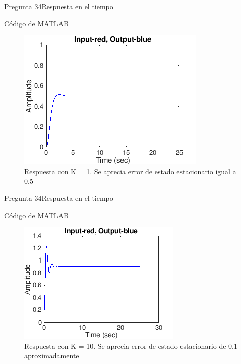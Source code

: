 \documentclass[10pt]{beamer}
\begin{document}
\begin{frame}{Pregunta 34}{Respuesta en el tiempo}
\begin{block}{Código de MATLAB}
\begin{figure}[h!]
\centering
\includegraphics [scale=0.6]{fig1}
\caption{Respuesta con K = 1. Se aprecia error de estado estacionario igual a 0.5}
\end{figure}
\end{block}
\end{frame}


\begin{frame}{Pregunta 34}{Respuesta en el tiempo}
\begin{block}{Código de MATLAB}
\begin{figure}[h!]
\centering
\includegraphics [scale=0.6]{fig2}
\caption{Respuesta con K = 10. Se aprecia error de estado estacionario de 0.1 aproximadamente}
\end{figure}
\end{block}
\end{frame}
\end{document}
